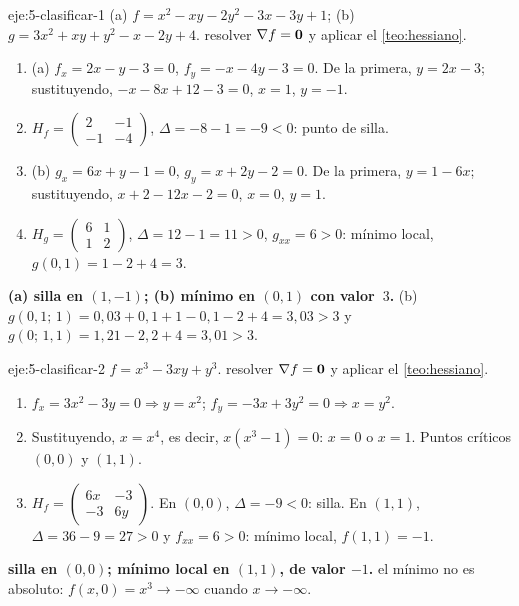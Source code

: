 \begin{solucion}{eje:5-clasificar-1}
\datos (a) $f=x^2-xy-2y^2-3x-3y+1$; (b) $g=3x^2+xy+y^2-x-2y+4$.
\planteamiento resolver $\nabla f=\mathbf{0}$ y aplicar el \cref{teo:hessiano}.
\pasos
\begin{enumerate}[label=\arabic*.]
  \item (a) $f_x=2x-y-3=0$, $f_y=-x-4y-3=0$. De la primera, $y=2x-3$; sustituyendo, $-x-8x+12-3=0$, $x=1$, $y=-1$.
  \item $H_f=\begin{pmatrix}2&-1\\-1&-4\end{pmatrix}$, $\Delta=-8-1=-9<0$: punto de silla.
  \item (b) $g_x=6x+y-1=0$, $g_y=x+2y-2=0$. De la primera, $y=1-6x$; sustituyendo, $x+2-12x-2=0$, $x=0$, $y=1$.
  \item $H_g=\begin{pmatrix}6&1\\1&2\end{pmatrix}$, $\Delta=12-1=11>0$, $g_{xx}=6>0$: mínimo local, $g(0,1)=1-2+4=3$.
\end{enumerate}
\resultado \textbf{(a) silla en $(1,-1)$; (b) mínimo en $(0,1)$ con valor~$3$.}
\comprobacion (b) $g(0{,}1;\,1)=0{,}03+0{,}1+1-0{,}1-2+4=3{,}03>3$ y $g(0;\,1{,}1)=1{,}21-2{,}2+4=3{,}01>3$.
\end{solucion}

\begin{solucion}{eje:5-clasificar-2}
\datos $f=x^3-3xy+y^3$.
\planteamiento resolver $\nabla f=\mathbf{0}$ y aplicar el \cref{teo:hessiano}.
\pasos
\begin{enumerate}[label=\arabic*.]
  \item $f_x=3x^2-3y=0\Rightarrow y=x^2$; $f_y=-3x+3y^2=0\Rightarrow x=y^2$.
  \item Sustituyendo, $x=x^4$, es decir, $x(x^3-1)=0$: $x=0$ o $x=1$. Puntos críticos $(0,0)$ y $(1,1)$.
  \item $H_f=\begin{pmatrix}6x&-3\\-3&6y\end{pmatrix}$. En $(0,0)$, $\Delta=-9<0$: silla. En $(1,1)$, $\Delta=36-9=27>0$ y $f_{xx}=6>0$: mínimo local, $f(1,1)=-1$.
\end{enumerate}
\resultado \textbf{silla en $(0,0)$; mínimo local en $(1,1)$, de valor $-1$.}
\comprobacion el mínimo no es absoluto: $f(x,0)=x^3\to-\infty$ cuando $x\to-\infty$.
\end{solucion}

